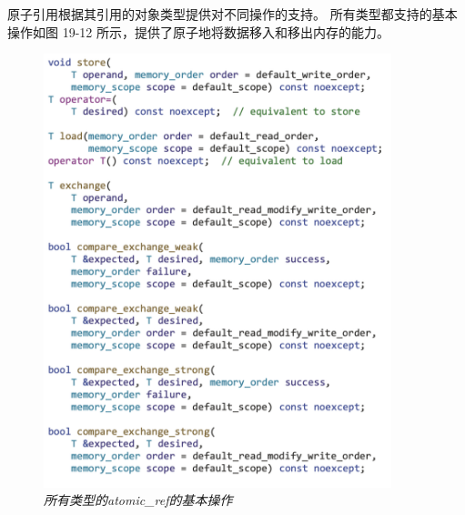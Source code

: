 原子引用根据其引用的对象类型提供对不同操作的支持。 
所有类型都支持的基本操作如图 19-12 所示，提供了原子地将数据移入和移出内存的能力。

\begin{figure}[H]
	\centering
	\includegraphics[width=0.9\textwidth]{figs/F19.12.png}
	\caption{\textit{所有类型的atomic\_ref的基本操作 }}
\end{figure}

